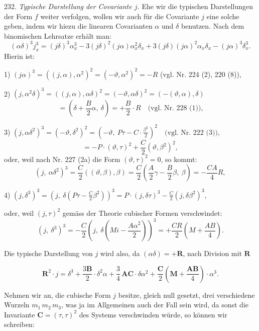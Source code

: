 \documentclass[11pt]{article}
\providecommand{\weberpage}[1]{}
\providecommand{\weq}[2]{\begin{equation}\tag{#1}#2\end{equation}}
\begin{document}
232. \textit{Typische Darstellung der Covariante $j$.} Ehe wir die typischen
Darstellungen der Form $f$ weiter verfolgen, wollen wir auch für die
Covariante $j$ eine solche geben, indem wir hiezu die linearen Covarianten
$\alpha$ und $\delta$ benutzen. Nach dem binomischen Lehrsatze erhält
man:
\[
(\alpha\delta)^3 j_x^3 = (j\delta)^3 \alpha_x^3 - 3(j\delta)^2(j\alpha)\alpha_x^2\delta_x + 3(j\delta)(j\alpha)^2\alpha_x\delta_x - (j\alpha)^3\delta_x^3.
\]
Hierin ist:

1) $(j\alpha)^3 = ((j,\alpha),\alpha^2)^2 = (-\vartheta,\alpha^2)^2 = -R$ (vgl. Nr. 224 (2), 220 (8)),

2) $(j,\alpha^2\delta)^3 = ((j,\alpha),\alpha\delta)^2 = (-\vartheta,\alpha\delta)^2 = (-(\vartheta,\alpha),\delta)$
\[
{} = \left(\delta + \frac{B}{2}\alpha,\ \delta\right) = +\frac{B}{2} \cdot R \quad \text{(vgl. Nr. 228 (1)),}
\]

3) $(j,\alpha\delta^2)^3 = (-\vartheta,\delta^2)^2 = \left(-\vartheta,\ P\tau - C \cdot \frac{\beta^2}{2}\right)^2 \quad \text{(vgl. Nr. 222 (3)),}$
\[
{} = -P \cdot (\vartheta,\tau)^2 + \frac{C}{2}(\vartheta,\beta^2)^2,
\]
oder, weil nach Nr. 227 (2a) die Form $(\vartheta,\tau)^2 = 0$, so kommt:
\[
(j,\ \alpha\delta^2)^3 = \frac{C}{2}\left((\vartheta,\beta),\beta\right) = \frac{C}{2}\left(\frac{A}{2}\gamma - \frac{B}{2}\beta,\ \beta\right) = -\frac{CA}{4}R,
\]

4) $(j,\delta^3)^3 = \left(j,\ \delta\left(P\tau - \frac{C}{2}\beta^2\right)\right)^3 = P \cdot (j,\delta\tau)^3 - \frac{C}{2}(j,\delta\beta^2)^3,$

oder, weil $(j,\tau)^2$ gemäss der Theorie cubischer Formen verschwindet:
\[
(j,\ \delta^3)^3 = -\frac{C}{2}\left(j,\ \delta\left(Mi - \frac{A\alpha^2}{2}\right)\right)^3 = +\frac{CR}{2}\left(M + \frac{AB}{4}\right).
\]


\weberpage{257}
Die typische Darstellung von $j$ wird also, da $(\alpha\delta) = +\mathbf{R}$, nach
Division mit $\mathbf{R}$

\weq{I}{
\mathbf{R}^2\cdot j = \delta^3 + \frac{3\mathbf{B}}{2}\cdot\delta^2\alpha + \frac34\,\mathbf{A}\mathbf{C}\cdot\delta\alpha^2 + \frac{\mathbf{C}}{2}\left(\mathbf{M}+\frac{\mathbf{A}\mathbf{B}}{4}\right)\cdot\alpha^3.
}

Nehmen wir an, die cubische Form $j$ besitze, gleich null gesetzt, drei
verschiedene Wurzeln $m_1\,m_2\,m_3$, was ja im Allgemeinen auch der
Fall sein wird, da sonst die Invariante $\mathbf{C} = (\tau,\tau)^2$ des Systems
verschwinden würde, so können wir schreiben:
\end{document}
